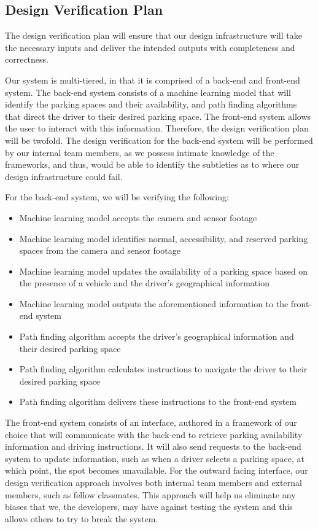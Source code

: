 \documentclass[12pt, titlepage]{article}
\begin{document}
\subsection{Design Verification Plan}
\label{sec:design}
The design verification plan will ensure that our design infrastructure will
take the necessary inputs and deliver the intended outputs with completeness and
correctness. 

Our system is multi-tiered, in that it is comprised of a back-end and front-end
system. The back-end system consists of a machine learning model that will
identify the parking spaces and their availability, and path finding algorithms
that direct the driver to their desired parking space. The front-end system
allows the user to interact with this information. Therefore, the design
verification plan will be twofold. The design verification for the back-end
system will be performed by our internal team members, as we possess intimate
knowledge of the frameworks, and thus, would be able to identify the subtleties
as to where our design infrastructure could fail. 

For the back-end system, we will be verifying the following:
\begin{itemize}
    \item Machine learning model accepts the camera and sensor footage
    \item Machine learning model identifies normal, accessibility, and reserved
    parking spaces from the camera and sensor footage
    \item Machine learning model updates the availability of a parking space
    based on the presence of a vehicle and the driver's geographical information
    \item Machine learning model outputs the aforementioned information to the
    front-end system
    \item Path finding algorithm accepts the driver's geographical information
    and their desired parking space
    \item Path finding algorithm calculates instructions to navigate the driver
    to their desired parking space
    \item Path finding algorithm delivers these instructions to the front-end
    system
\end{itemize}

The front-end system consists of an interface, authored in a framework of our
choice that will communicate with the back-end to retrieve parking availability
information and driving instructions. It will also send requests to the back-end
system to update information, such as when a driver selects a parking space, at
which point, the spot becomes unavailable. For the outward facing interface, our
design verification approach involves both internal team members and external
members, such as fellow classmates. This approach will help us eliminate any
biases that we, the developers, may have against testing the system and this
allows others to try to break the system.
\end{document}
